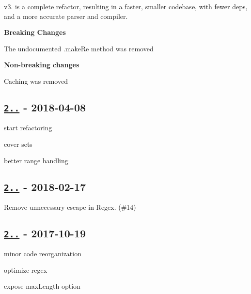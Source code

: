 v3. is a complete refactor, resulting in a faster, smaller codebase, with fewer deps, and a more accurate parser and compiler.

{\bfseries Breaking Changes}


\begin{DoxyItemize}
\item The undocumented {\ttfamily .make\+Re} method was removed
\end{DoxyItemize}

{\bfseries Non-\/breaking changes}


\begin{DoxyItemize}
\item Caching was removed
\end{DoxyItemize}

\subsection*{\href{https://github.com/micromatch/braces/compare/2.3.1...2.3.2}{\tt 2..} -\/ 2018-\/04-\/08}


\begin{DoxyItemize}
\item start refactoring
\item cover sets
\item better range handling
\end{DoxyItemize}

\subsection*{\href{https://github.com/micromatch/braces/compare/2.3.0...2.3.1}{\tt 2..} -\/ 2018-\/02-\/17}


\begin{DoxyItemize}
\item Remove unnecessary escape in Regex. (\#14)
\end{DoxyItemize}

\subsection*{\href{https://github.com/micromatch/braces/compare/2.2.1...2.3.0}{\tt 2..} -\/ 2017-\/10-\/19}


\begin{DoxyItemize}
\item minor code reorganization
\item optimize regex
\item expose {\ttfamily max\+Length} option
\end{DoxyItemize}


